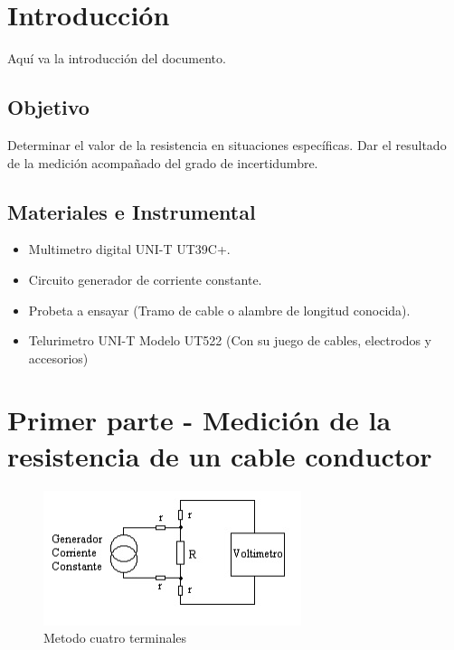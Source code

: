 \documentclass[12pt, letterpaper]{article}
\begin{document}
\newpage
\tableofcontents
\newpage

\section{Introducción}

Aquí va la introducción del documento.

\subsection{Objetivo}
Determinar el valor de la resistencia en situaciones específicas. Dar el resultado de la
medición acompañado del grado de incertidumbre.

\subsection{Materiales e Instrumental}
\begin{itemize}
	\item Multimetro digital UNI-T UT39C+.
	\item Circuito generador de corriente constante.
	\item Probeta a ensayar (Tramo de cable o alambre de longitud conocida).
	\item Telurimetro UNI-T Modelo UT522 (Con su juego de cables, electrodos y accesorios)
\end{itemize}


\section{Primer parte - Medición de la resistencia de un cable conductor}

\begin{figure}[h]
	\centering
	\includegraphics{Imagenes/met_4_terminales.jpg}
	\caption{Metodo cuatro terminales}
\end{figure}
\end{document}
